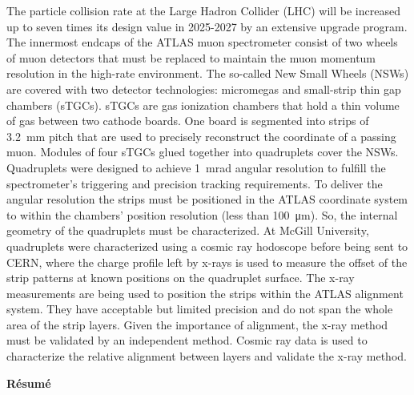 The particle collision rate at the Large Hadron Collider (LHC) will be increased up to seven times its design value in 2025-2027 by an extensive upgrade program. The innermost endcaps of the ATLAS muon spectrometer consist of two wheels of muon detectors that must be replaced to maintain the muon momentum resolution in the high-rate environment. The so-called New Small Wheels (NSWs) are covered with two detector technologies: micromegas and small-strip thin gap chambers (sTGCs). sTGCs are gas ionization chambers that hold a thin volume of gas between two cathode boards. One board is segmented into strips of \SI{3.2}{mm} pitch that are used to precisely reconstruct the coordinate of a passing muon. Modules of four sTGCs glued together into quadruplets cover the NSWs. Quadruplets were designed to achieve \SI{1}{mrad} angular resolution to fulfill the spectrometer's triggering and precision tracking requirements. To deliver the angular resolution the strips must be positioned in the ATLAS coordinate system to within the chambers' position resolution (less than \SI{100}{\micro\meter}). So, the internal geometry of the quadruplets must be characterized. At McGill University, quadruplets were characterized using a cosmic ray hodoscope before being sent to CERN, where the charge profile left by x-rays is used to measure the offset of the strip patterns at known positions on the quadruplet surface. The x-ray measurements are being used to position the strips within the ATLAS alignment system. They have acceptable but limited precision and do not span the whole area of the strip layers. Given the importance of alignment, the x-ray method must be validated by an independent method. Cosmic ray data is used to characterize the relative alignment between layers and validate the x-ray method.

\cleardoublepage


\begin{center}\textbf{R\'{e}sum\'{e}}\end{center}

